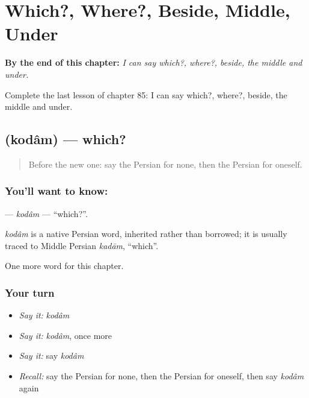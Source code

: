 
\chapter{Which?, Where?, Beside, Middle, Under}
\label{ch:fa-which-where-beside-middle-under}

\begin{chapteropening}
\textbf{By the end of this chapter:} \emph{I can say which?, where?, beside, the middle and under.}

Complete the last lesson of chapter 85: I can say which?, where?, beside, the middle and under.
\end{chapteropening}

\section[\texorpdfstring{\fa{کدام} (kodâm)}{کدام (kodâm)}]{ (kodâm) — which?}

\label{lesson:FA-C85-kodam}



\begin{quote}
Before the new one: say the Persian for none, then the Persian for oneself.
\end{quote}

\subsection*{You'll want to know: }
\textbf{} — \emph{kodâm} — \textquotedblleft{}which?\textquotedblright{}.

\begin{cousinweb}
\emph{kodâm} is a native Persian word, inherited rather than borrowed; it is usually traced to Middle Persian \emph{kadām}, \textquotedblleft{}which\textquotedblright{}.
\end{cousinweb}

\begin{grammarlens}[title={What you've built}]
One more word for this chapter.
\end{grammarlens}

\subsection*{Your turn}
\begin{itemize}
\raggedright
  \item \emph{Say it:} \emph{kodâm}
  \item \emph{Say it:} \emph{kodâm}, once more
  \item \emph{Say it:} say \emph{kodâm}
  \item \emph{Recall:} say the Persian for none, then the Persian for oneself, then say \emph{kodâm} again
\end{itemize}

